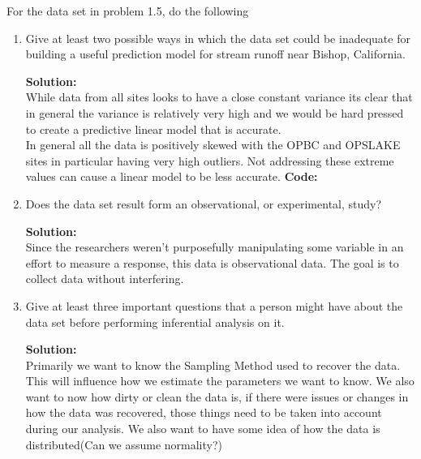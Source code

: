 \documentclass[12pt]{article}
\makeatletter
\theoremstyle{homework}
\newenvironment{exercise}[1]
{\def\@currentlabel{#1}\exercisecore}
{\endexercisecore}
\newcommand{\localhead}[1]{\par\smallskip\noindent\textbf{#1}\nobreak\\}%
\newcommand\solution{\localhead{Solution:}}
\makeatother
\begin{document}
\begin{exercise}{2} For the data set in problem 1.5, do the following
    \begin{enumerate}
        \item Give at least two possible ways in which the data set could be inadequate 
        for building a useful prediction model for stream runoff near Bishop, California. \\
        \solution While data from all sites looks to have a close constant variance its clear that in 
        general the variance is relatively very high and we would be hard pressed to create a predictive linear model
        that is accurate. \\

        In general all the data is positively skewed with the OPBC and OPSLAKE sites in particular having very high outliers.
        Not addressing these extreme values can cause a linear model to be less accurate. 
        \textbf{Code:}
            \begin{center}
                     
            \end{center}
        \vspace{.25in}
        \item Does the data set result form an observational, or experimental, study?\\
        
        \solution Since the researchers weren't purposefully manipulating some variable in an effort to 
        measure a response, this data is observational data. The goal is to collect data without interfering. 
        \vspace{.25in}

        \item Give at least three important questions that a person might have about the data
        set before performing inferential analysis on it.\\
        \solution Primarily we want to know the Sampling Method used to recover the data. This will influence how we 
        estimate the parameters we want to know. We also want to now how dirty or clean the data is, if there were issues or changes
        in how the data was recovered, those things need to be taken into account during our analysis. We also want to have some idea of 
        how the data is distributed(Can we assume normality?)
        \vspace{.25in}


\end{enumerate}
\end{exercise}
\end{document}
